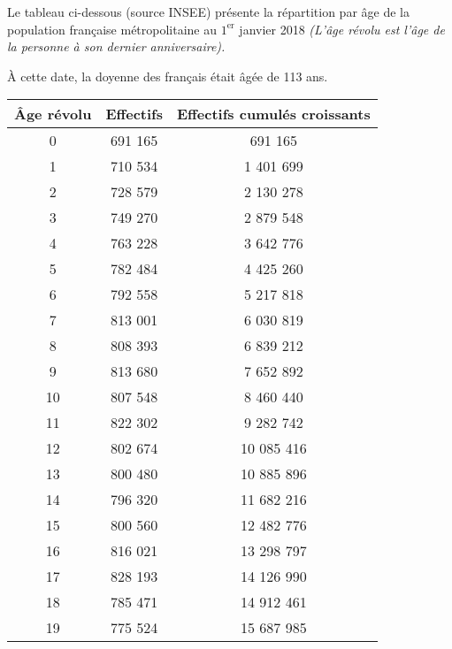 

\par
Le tableau ci-dessous (source INSEE) présente la répartition par âge de la population française métropolitaine au $1^\text{er}$ janvier 2018
\textit{(L'âge révolu est l'âge de la personne à son dernier anniversaire).}
\par
\`A cette date, la doyenne des français était âgée de 113 ans.
\begin{center}
     \begin{tabular}{|c|c|c|}\hline %
          Âge révolu  &  Effectifs  & Effectifs cumulés croissants \\ \hline
          0  &  691 165  &  691 165 \\ \hline
          1  &  710 534  &  1 401 699 \\ \hline
          2  &  728 579  &  2 130 278 \\ \hline
          3  &  749 270  &  2 879 548 \\ \hline
          4  &  763 228  &  3 642 776 \\ \hline
          5  &  782 484  &  4 425 260 \\ \hline
          6  &  792 558  &  5 217 818 \\ \hline
          7  &  813 001  &  6 030 819 \\ \hline
          8  &  808 393  &  6 839 212 \\ \hline
          9  &  813 680  &  7 652 892 \\ \hline
          10  &  807 548  &  8 460 440 \\ \hline
          11  &  822 302  &  9 282 742 \\ \hline
          12  &  802 674  &  10 085 416 \\ \hline
          13  &  800 480  &  10 885 896 \\ \hline
          14  &  796 320  &  11 682 216 \\ \hline
          15  &  800 560  &  12 482 776 \\ \hline
          16  &  816 021  &  13 298 797 \\ \hline
          17  &  828 193  &  14 126 990 \\ \hline
          18  &  785 471  &  14 912 461 \\ \hline
          19  &  775 524  &  15 687 985 \\ \hline

\end{tabular}
\end{center}
